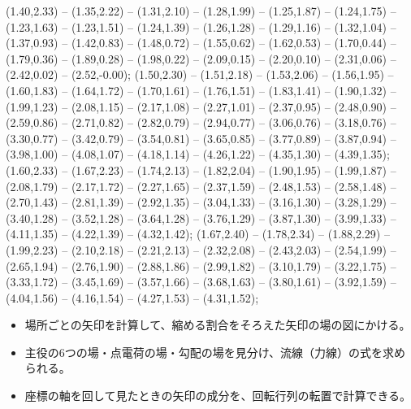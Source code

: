 {   (1.40,2.33) -- (1.35,2.22) -- (1.31,2.10) -- (1.28,1.99) -- (1.25,1.87) -- (1.24,1.75) -- (1.23,1.63) -- (1.23,1.51) -- (1.24,1.39) -- (1.26,1.28) -- (1.29,1.16) -- (1.32,1.04) -- (1.37,0.93) -- (1.42,0.83) -- (1.48,0.72) -- (1.55,0.62) -- (1.62,0.53) -- (1.70,0.44) -- (1.79,0.36) -- (1.89,0.28) -- (1.98,0.22) -- (2.09,0.15) -- (2.20,0.10) -- (2.31,0.06) -- (2.42,0.02) -- (2.52,-0.00);
   (1.50,2.30) -- (1.51,2.18) -- (1.53,2.06) -- (1.56,1.95) -- (1.60,1.83) -- (1.64,1.72) -- (1.70,1.61) -- (1.76,1.51) -- (1.83,1.41) -- (1.90,1.32) -- (1.99,1.23) -- (2.08,1.15) -- (2.17,1.08) -- (2.27,1.01) -- (2.37,0.95) -- (2.48,0.90) -- (2.59,0.86) -- (2.71,0.82) -- (2.82,0.79) -- (2.94,0.77) -- (3.06,0.76) -- (3.18,0.76) -- (3.30,0.77) -- (3.42,0.79) -- (3.54,0.81) -- (3.65,0.85) -- (3.77,0.89) -- (3.87,0.94) -- (3.98,1.00) -- (4.08,1.07) -- (4.18,1.14) -- (4.26,1.22) -- (4.35,1.30) -- (4.39,1.35);
   (1.60,2.33) -- (1.67,2.23) -- (1.74,2.13) -- (1.82,2.04) -- (1.90,1.95) -- (1.99,1.87) -- (2.08,1.79) -- (2.17,1.72) -- (2.27,1.65) -- (2.37,1.59) -- (2.48,1.53) -- (2.58,1.48) -- (2.70,1.43) -- (2.81,1.39) -- (2.92,1.35) -- (3.04,1.33) -- (3.16,1.30) -- (3.28,1.29) -- (3.40,1.28) -- (3.52,1.28) -- (3.64,1.28) -- (3.76,1.29) -- (3.87,1.30) -- (3.99,1.33) -- (4.11,1.35) -- (4.22,1.39) -- (4.32,1.42);
   (1.67,2.40) -- (1.78,2.34) -- (1.88,2.29) -- (1.99,2.23) -- (2.10,2.18) -- (2.21,2.13) -- (2.32,2.08) -- (2.43,2.03) -- (2.54,1.99) -- (2.65,1.94) -- (2.76,1.90) -- (2.88,1.86) -- (2.99,1.82) -- (3.10,1.79) -- (3.22,1.75) -- (3.33,1.72) -- (3.45,1.69) -- (3.57,1.66) -- (3.68,1.63) -- (3.80,1.61) -- (3.92,1.59) -- (4.04,1.56) -- (4.16,1.54) -- (4.27,1.53) -- (4.31,1.52);
}
\newcommand\kviiifpanelS[5][]{%
  \begin{tikzpicture}[x=5mm, y=5mm, baseline=(current bounding box.north)]
    \draw[kviiif frame, fill=white] (-2.6,-2.6) rectangle (2.6,2.6);
    \draw[bkLine, line width=0.5pt] (-2.6,0) -- (2.6,0) (0,-2.6) -- (0,2.6);
    \kviiiffield[pivot=mid, dot=0, #1]{#2}{#3}
    #4
    \node[kviiif lab, anchor=north] at (0,-2.85) {#5};
  \end{tikzpicture}}
\makeatother


\begin{goal}
\begin{itemize}[label={\color{\bkTT}●}, leftmargin=1.6\zw, itemsep=0pt, topsep=1pt]
\item {}\enspace 場所ごとの矢印を計算して、縮める割合をそろえた矢印の場の図にかける。
\item {}\enspace 主役の6つの場・点電荷の場・勾配の場を見分け、流線（力線）の式を求められる。
\item {}\enspace 座標の軸を回して見たときの矢印の成分を、回転行列の転置で計算できる。
\end{itemize}
\end{goal}

